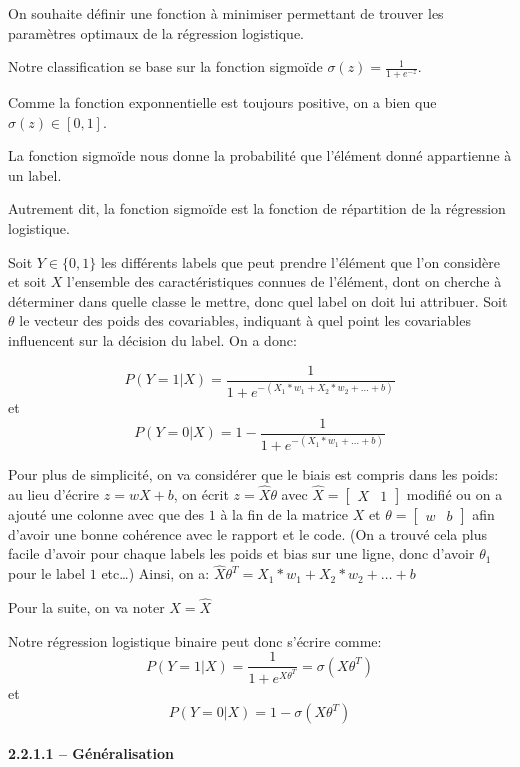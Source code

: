 \documentclass[
]{article}
\begin{document}
On souhaite définir une fonction à minimiser permettant de trouver les
paramètres optimaux de la régression logistique.

Notre classification se base sur la fonction sigmoïde
\(\sigma(z) = \frac{1}{1 + e^{-z}}\).

Comme la fonction exponnentielle est toujours positive, on a bien que
\(\sigma(z) \in [0, 1]\).

La fonction sigmoïde nous donne la probabilité que l'élément donné
appartienne à un label.

Autrement dit, la fonction sigmoïde est la fonction de répartition de la
régression logistique.

Soit \(Y \in \{0, 1\}\) les différents labels que peut prendre l'élément
que l'on considère et soit \(X\) l'ensemble des caractéristiques connues
de l'élément, dont on cherche à déterminer dans quelle classe le mettre,
donc quel label on doit lui attribuer. Soit \(\theta\) le vecteur des
poids des covariables, indiquant à quel point les covariables
influencent sur la décision du label. On a donc:

\[P(Y = 1 | X) = \frac{1}{1 + e^{-(X_1 * w_1 + X_2*w_2 + \dots + b)}}\]
et \[P(Y = 0 | X) = 1 - \frac{1}{1 + e^{-(X_1 * w_1 + \dots + b)}}\]

Pour plus de simplicité, on va considérer que le biais est compris dans
les poids: au lieu d'écrire \(z = wX + b\), on écrit
\(z = \hat{X}\theta\) avec
\(\hat{X} = \begin{bmatrix} X & 1 \end{bmatrix}\) modifié ou on a ajouté
une colonne avec que des \(1\) à la fin de la matrice \(X\) et
\(\theta = \begin{bmatrix} w & b \end{bmatrix}\) afin d'avoir une bonne
cohérence avec le rapport et le code. (On a trouvé cela plus facile
d'avoir pour chaque labels les poids et bias sur une ligne, donc d'avoir
\(\theta_1\) pour le label \(1\) etc\ldots) Ainsi, on a:
\(\hat{X} \theta^T = X_1 * w_1 + X_2 * w_2 + \dots + b\)

Pour la suite, on va noter \(X = \hat{X}\)

Notre régression logistique binaire peut donc s'écrire comme:
\[P(Y = 1 | X) = \frac{1}{1 + e^{X \theta^T}} = \sigma(X \theta^T)\] et
\[P(Y = 0 | X) = 1 - \sigma(X \theta^T)\]

\hypertarget{guxe9nuxe9ralisation}{%
\paragraph{2.2.1.1 -- Généralisation}\label{guxe9nuxe9ralisation}}
\end{document}
